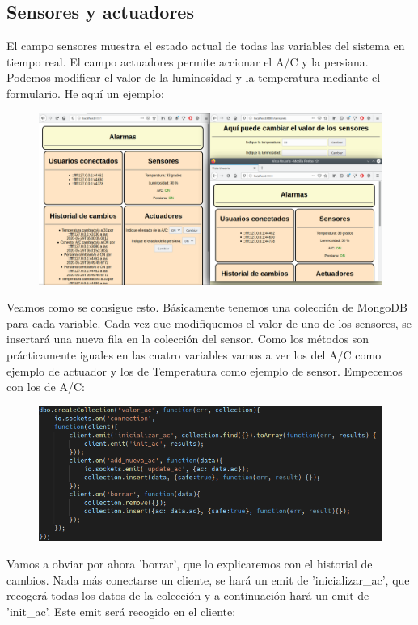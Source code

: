 \documentclass{article}
\begin{document}
	\subsection{Sensores y actuadores}
	El campo sensores muestra el estado actual de todas las variables del sistema en tiempo real. El campo actuadores permite accionar el A/C y la persiana. Podemos modificar el valor de la luminosidad y la temperatura mediante el formulario. He aquí un ejemplo:
	\begin{figure}[H]
		\centering
		\includegraphics[totalheight=6cm]{img/7.png}
	\end{figure}
	Veamos como se consigue esto. Básicamente tenemos una colección de MongoDB para cada variable. Cada vez que modifiquemos el valor de uno de los sensores, se insertará una nueva fila en la colección del sensor. Como los métodos son prácticamente iguales en las cuatro variables vamos a ver los del A/C como ejemplo de actuador y los de Temperatura como ejemplo de sensor. Empecemos con los de A/C:
	\begin{figure}[H]
		\centering
		\includegraphics[totalheight=4.7cm]{img/8.png}
	\end{figure}
	Vamos a obviar por ahora 'borrar', que lo explicaremos con el historial de cambios. Nada más conectarse un cliente, se hará un emit de 'inicializar\_ac', que recogerá todas los datos de la colección y a continuación hará un emit de 'init\_ac'. Este emit será recogido en el cliente:
\end{document}
